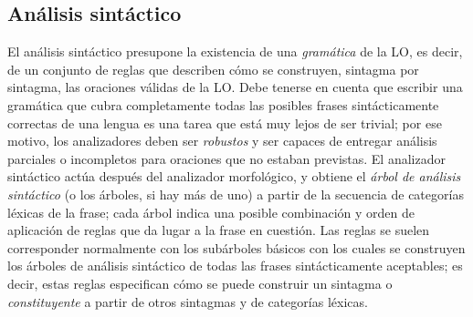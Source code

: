 \subsection{Análisis sintáctico} \label{s3:ansyn} El análisis sintáctico presupone la existencia de una \emph{gramática} de la LO, es decir, de un conjunto de reglas que describen cómo se construyen, sintagma por sintagma, las oraciones válidas de la LO. Debe tenerse en cuenta que escribir una gramática que cubra completamente todas las posibles frases sintácticamente correctas de una lengua es una tarea que está muy lejos de ser trivial; por ese motivo, los analizadores deben ser \emph{robustos} y ser capaces de entregar análisis parciales o incompletos para oraciones que no estaban previstas. El analizador sintáctico actúa después del analizador morfológico, y obtiene el \emph{árbol de análisis sintáctico} (o los árboles, si hay más de uno) a partir de la secuencia de categorías léxicas de la frase; cada árbol indica una posible combinación y orden de aplicación de reglas que da lugar a la frase en cuestión. Las reglas se suelen corresponder normalmente con los subárboles básicos con los cuales se construyen los árboles de análisis sintáctico de todas las frases sintácticamente aceptables; es decir, estas reglas especifican cómo se puede construir un sintagma o {\em constituyente} a partir de otros sintagmas y de categorías léxicas. 

